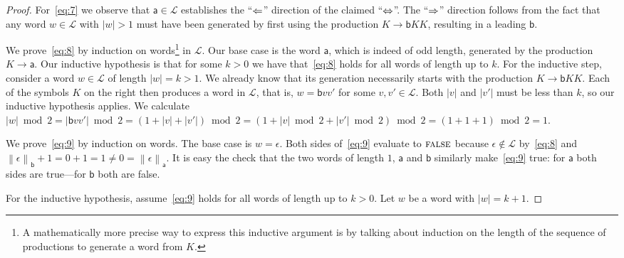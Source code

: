 \documentclass[a4paper]{scrartcl}
\newcommand{\ah}{\mathsf{a}}
\newcommand{\be}{\mathsf{b}}
\newcommand{\length}[1]{\left|#1\right|}
\newcommand{\noof}[2]{\left\|#1\right\|_{#2}}
\def\L{\mathcal{L}}
\begin{document}
\begin{proof}
  For~\eqref{eq:7} we observe that $\ah\in\L$ establishes the
  ``$\Leftarrow$'' direction of the claimed ``$\Leftrightarrow$''. The
  ``$\Rightarrow$'' direction follows from the fact that any word
  $w\in\L$ with $\length w > 1$ must have been generated by
  first using the production $K\to\be KK$, resulting in a leading
  $\be$.

  We prove~\eqref{eq:8} by induction on words\footnote{A
    mathematically more precise way to express this inductive argument
    is by talking about induction on the length of the sequence of
    productions to generate a word from $K$.} in $\L$. Our base
  case is the word $\ah$, which is indeed of odd length, generated by
  the production $K\to\ah$. Our inductive hypothesis is that for some
  $k>0$ we have that~\eqref{eq:8} holds for all words of length up to
  $k$. For the inductive step, consider a word $w\in\L$ of
  length $\length w = k>1$. We already know that its generation
  necessarily starts with the production $K\to\be KK$. Each of the
  symbols $K$ on the right then produces a word in $\L$, that
  is, $w = \be v v'$ for some $v,v'\in\L$. Both $\length v$ and
  $\length{v'}$ must be less than $k$, so our inductive hypothesis
  applies. We calculate $\length w \bmod 2 = \length{\be v v'} \bmod 2
  = (1+\length v+\length{v'}) \bmod 2 = (1+\length v \bmod
  2+\length{v'} \bmod 2) \bmod 2 = (1+1+1) \bmod 2 = 1$.

  We prove~\eqref{eq:9} by induction on words. The base case is
  $w=\epsilon$. Both sides of~\eqref{eq:9} evaluate to $\text{\textsc{false}}$
  because $\epsilon\notin\L$ by~\eqref{eq:8} and
  $\noof\epsilon\be+1= 0+1 = 1 \neq 0 = \noof\epsilon\ah$. It is easy
  the check that the two words of length $1$, $\ah$ and $\be$
  similarly make~\eqref{eq:9} true: for $\ah$ both sides are
  true---for $\be$ both are false.

  For the inductive hypothesis, assume~\eqref{eq:9} holds for all
  words of length up to $k>0$. Let $w$ be a word with $\length w =
  k+1$. 


\end{proof}
\end{document}
